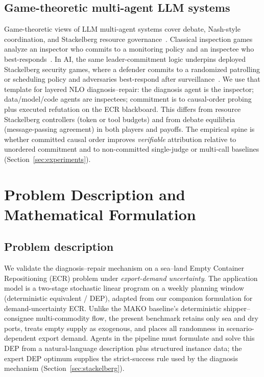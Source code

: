 \documentclass[a4paper,fleqn]{cas-sc}
\begin{document}
\subsection{Game-theoretic multi-agent LLM systems}
\label{sec:related_game}
Game-theoretic views of LLM multi-agent systems cover debate, Nash-style
coordination, and Stackelberg resource
governance~\citep{yi2025econ,stackelberg2026resource,du2023improving}.
Classical inspection games analyze an inspector who commits to a monitoring
policy and an inspectee who best-responds~\citep{avenhaus2002inspection,maschler1966inspection}.
In AI, the same leader-commitment logic underpins deployed Stackelberg
security games, where a defender commits to a randomized patrolling or
scheduling policy and adversaries best-respond after
surveillance~\citep{korzhyk2011security,tambe2011security}.
We use that template for layered NLO diagnosis--repair: the diagnosis agent
is the inspector; data/model/code agents are inspectees; commitment is to
causal-order probing plus executed refutation on the ECR blackboard. This
differs from resource Stackelberg controllers (token or tool budgets) and
from debate equilibria (message-passing agreement) in both players and
payoffs. The empirical spine is whether committed causal order improves
\emph{verifiable} attribution relative to unordered commitment and to
non-committed single-judge or multi-call baselines
(Section~\ref{sec:experiments}).

\section{Problem Description and Mathematical Formulation}
\label{sec:ecr_model}

\subsection{Problem description}
\label{sec:ecr_desc}
\label{sec:ecr_network}

We validate the diagnosis--repair mechanism on a sea--land Empty Container
Repositioning (ECR) problem under \emph{export-demand uncertainty}. The
application model is a two-stage stochastic linear program on a weekly
planning window (deterministic equivalent / DEP), adapted from our companion
formulation for demand-uncertainty ECR. Unlike the MAKO baseline's
deterministic shipper--consignee multi-commodity flow, the present benchmark
retains only sea and dry ports, treats empty supply as exogenous, and places
all randomness in scenario-dependent export demand. Agents in the pipeline
must formulate and solve this DEP from a natural-language description plus
structured instance data; the expert DEP optimum supplies the
strict-success rule used by the diagnosis mechanism
(Section~\ref{sec:stackelberg}).
\end{document}
